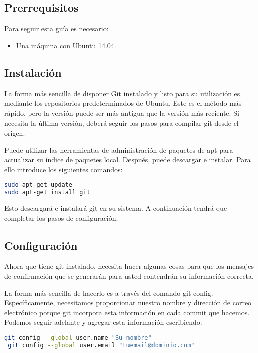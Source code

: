 \subsection{Prerrequisitos}

Para seguir esta guía es necesario:
\begin{itemize}
\item{Una máquina con Ubuntu 14.04.}
\end{itemize}

\subsection{Instalación}

La forma más sencilla de disponer Git instalado y listo para su utilización es mediante los repositorios predeterminados de Ubuntu. Este es el método más rápido, pero la versión puede ser más antigua que la versión más reciente. Si necesita la última versión, deberá seguir los pasos para compilar git desde el origen.

Puede utilizar las herramientas de administración de paquetes de apt para actualizar su índice de paquetes local. Después, puede descargar e instalar. Para ello introduce los siguientes comandos:

\begin{lstlisting}[language=bash]
sudo apt-get update
sudo apt-get install git
\end{lstlisting}

Esto descargará e instalará git en su sistema. A continuación tendrá que completar los pasos de configuración.

\subsection{Configuración}

Ahora que tiene git instalado, necesita hacer algunas cosas para que los mensajes de confirmación que se generarán para usted contendrán su información correcta.

La forma más sencilla de hacerlo es a través del comando git config. Específicamente, necesitamos proporcionar nuestro nombre y dirección de correo electrónico porque git incorpora esta información en cada commit que hacemos. Podemos seguir adelante y agregar esta información escribiendo:

\begin{lstlisting}[language=bash]
 git config --global user.name "Su nombre"
 git config --global user.email "tuemail@dominio.com"
\end{lstlisting}


